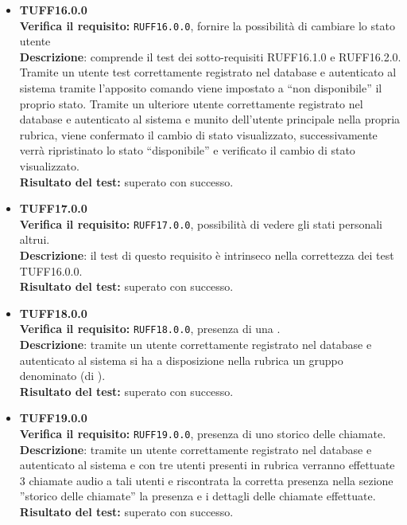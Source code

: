 \begin{itemize}
\item \textbf{TUFF16.0.0}\\
\textbf{Verifica il requisito:} \texttt{RUFF16.0.0}, fornire la possibilità di cambiare lo stato utente\\
\textbf{Descrizione}: comprende il test dei sotto-requisiti RUFF16.1.0 e RUFF16.2.0. Tramite un utente test correttamente registrato nel database e autenticato al sistema tramite l'apposito comando viene impostato a ``non disponibile'' il proprio stato. Tramite un ulteriore utente  correttamente registrato nel database e autenticato al sistema e munito dell'utente  principale nella propria rubrica, viene confermato il cambio di stato visualizzato, successivamente verrà ripristinato lo stato ``disponibile'' e verificato il cambio di stato visualizzato.\\
\textbf{Risultato del test:} superato con successo.

\item \textbf{TUFF17.0.0}\\
\textbf{Verifica il requisito:} \texttt{RUFF17.0.0}, possibilità di vedere gli stati personali altrui.\\
\textbf{Descrizione}: il test di questo requisito è intrinseco nella correttezza dei test TUFF16.0.0.\\
\textbf{Risultato del test:} superato con successo.

\item \textbf{TUFF18.0.0}\\ %
\textbf{Verifica il requisito:} \texttt{RUFF18.0.0}, presenza di una .\\
\textbf{Descrizione}: tramite un utente  correttamente registrato nel database e autenticato al sistema si ha a disposizione nella rubrica un gruppo denominato  (di ).\\
\textbf{Risultato del test:} superato con successo.

\item \textbf{TUFF19.0.0}\\
\textbf{Verifica il requisito:} \texttt{RUFF19.0.0}, presenza di uno storico delle chiamate.\\
\textbf{Descrizione}: tramite un utente  correttamente registrato nel database e autenticato al sistema e con tre utenti presenti in rubrica verranno effettuate 3 chiamate audio a tali utenti e riscontrata la corretta presenza nella sezione ''storico delle chiamate'' la presenza e i dettagli delle chiamate effettuate.\\
\textbf{Risultato del test:} superato con successo.


\end{itemize}
